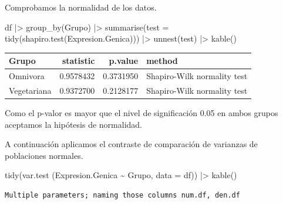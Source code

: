 \documentclass[
  a4paper,
]{scrreport}
\newenvironment{Shaded}{\begin{snugshade}}{\end{snugshade}}
\newcommand{\AttributeTok}[1]{\textcolor[rgb]{0.40,0.45,0.13}{#1}}
\newcommand{\FunctionTok}[1]{\textcolor[rgb]{0.28,0.35,0.67}{#1}}
\newcommand{\NormalTok}[1]{\textcolor[rgb]{0.00,0.23,0.31}{#1}}
\newcommand{\SpecialCharTok}[1]{\textcolor[rgb]{0.37,0.37,0.37}{#1}}
\theoremstyle{definition}
\theoremstyle{remark}
\begin{document}
\begin{tcolorbox}
Comprobamos la normalidad de los datos.

\begin{Shaded}
\begin{Highlighting}[]
\NormalTok{df }\SpecialCharTok{|\textgreater{}} 
    \FunctionTok{group\_by}\NormalTok{(Grupo) }\SpecialCharTok{|\textgreater{}} 
    \FunctionTok{summarise}\NormalTok{(}\AttributeTok{test =} \FunctionTok{tidy}\NormalTok{(}\FunctionTok{shapiro.test}\NormalTok{(Expresion.Genica))) }\SpecialCharTok{|\textgreater{}} 
    \FunctionTok{unnest}\NormalTok{(test) }\SpecialCharTok{|\textgreater{}} 
    \FunctionTok{kable}\NormalTok{()}
\end{Highlighting}
\end{Shaded}

\begin{longtable}[]{@{}lrrl@{}}
\toprule\noalign{}
Grupo & statistic & p.value & method \\
\midrule\noalign{}
\endhead
\bottomrule\noalign{}
\endlastfoot
Omnivora & 0.9578432 & 0.3731950 & Shapiro-Wilk normality test \\
Vegetariana & 0.9372700 & 0.2128177 & Shapiro-Wilk normality test \\
\end{longtable}

Como el p-valor es mayor que el nivel de significación 0.05 en ambos
grupos aceptamos la hipótesis de normalidad.

A continuación aplicamos el contraste de comparación de varianzas de
poblaciones normales.

\begin{Shaded}
\begin{Highlighting}[]
\FunctionTok{tidy}\NormalTok{(}\FunctionTok{var.test}\NormalTok{ (Expresion.Genica }\SpecialCharTok{\textasciitilde{}}\NormalTok{ Grupo, }\AttributeTok{data =}\NormalTok{ df)) }\SpecialCharTok{|\textgreater{}} 
    \FunctionTok{kable}\NormalTok{()}
\end{Highlighting}
\end{Shaded}

\begin{verbatim}
Multiple parameters; naming those columns num.df, den.df
\end{verbatim}


\end{tcolorbox}
\end{document}

